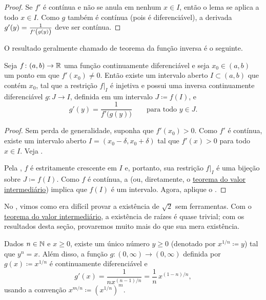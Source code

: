 \begin{proof}
Se $f'$ é contínua e não se anula em nenhum $x \in I$, então o lema se aplica a todo $x \in I$. Como $g$ também é contínua (pois é diferenciável), a derivada $g'(y)=\frac{1}{f'\left(\vphantom{1^1_1}g(y)\right)}$ deve ser contínua.
\end{proof}

O resultado geralmente chamado de teorema da função inversa é o seguinte.

\begin{thm}
Seja $f \colon (a,b) \to {\mathbb{R}}$ uma função continuamente diferenciável e seja $x_0 \in (a,b)$ um ponto em que $f'(x_0) \neq 0$. Então existe um intervalo aberto $I \subset (a,b)$ que contém $x_0$, tal que a restrição $f|_I$ é injetiva e possui uma inversa continuamente diferenciável $g \colon J \to I$, definida em um intervalo $J \coloneqq f(I)$, e
\begin{equation*}
g'(y) = \frac{1}{f'\bigl( g(y) \bigr)} \qquad \text{para todo } y \in J.
\end{equation*}
\end{thm}

\begin{proof}
Sem perda de generalidade, suponha que $f'(x_0)>0$. Como $f'$ é contínua, existe um intervalo aberto $I=(x_0-\delta,x_0+\delta)$ tal que $f'(x)>0$ para todo $x \in I$. Veja .

Pela , $f$ é estritamente crescente em $I$ e, portanto, sua restrição $f|_I$ é uma bijeção sobre $J \coloneqq f(I)$. Como $f$ é contínua, a  (ou, diretamente, o \hyperref[IVT:thm]{teorema do valor intermediário}) implica que $f(I)$ é um intervalo.
Agora, aplique o .
\end{proof}

No , vimos como era difícil provar a existência de $\sqrt{2}$ sem ferramentas. Com o \hyperref[IVT:thm]{teorema do valor intermediário}, a existência de raízes é quase trivial; com os resultados desta seção, provaremos muito mais do que sua mera existência.

\begin{cor}
Dados $n \in {\mathbb{N}}$ e $x \geq 0$, existe um único número $y \geq 0$ (denotado por $x^{1/n} \coloneqq y$) tal que $y^n=x$. Além disso, a função $g \colon (0,\infty) \to (0,\infty)$ definida por $g(x) \coloneqq x^{1/n}$ é continuamente diferenciável e
\begin{equation*}
g'(x) = \frac{1}{nx^{(n-1)/n}} = \frac{1}{n} \, x^{(1-n)/n} ,
\end{equation*}
usando a convenção $x^{m/n} \coloneqq {(x^{1/n})}^{m}$.
\end{cor}

